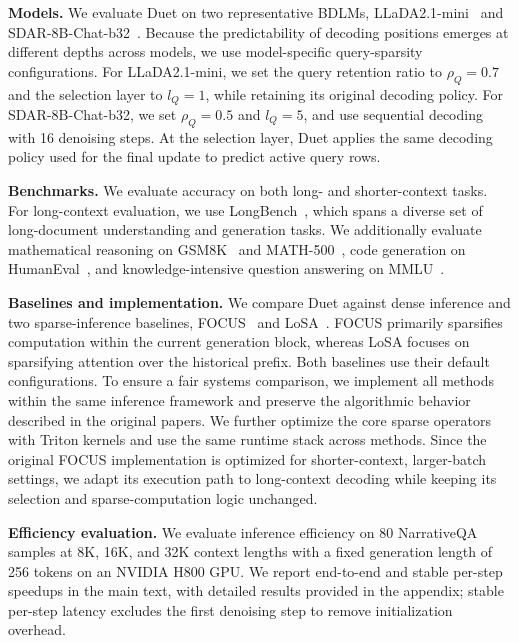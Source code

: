 \textbf{Models.} We evaluate Duet on two representative BDLMs, LLaDA2.1-mini~\citep{bie2026llada21speedingtextdiffusion} and SDAR-8B-Chat-b32~\citep{cheng2025sdar}. Because the predictability of decoding positions emerges at different depths across models, we use model-specific query-sparsity configurations. For LLaDA2.1-mini, we set the query retention ratio to $\rho_Q=0.7$ and the selection layer to $l_Q=1$, while retaining its original decoding policy. For SDAR-8B-Chat-b32, we set $\rho_Q=0.5$ and $l_Q=5$, and use sequential decoding with 16 denoising steps. At the selection layer, Duet applies the same decoding policy used for the final update to predict active query rows.

\textbf{Benchmarks.} We evaluate accuracy on both long- and shorter-context tasks. For long-context evaluation, we use LongBench~\citep{bai2024longbench}, which spans a diverse set of long-document understanding and generation tasks. We additionally evaluate mathematical reasoning on GSM8K~\citep{cobbe2021gsm8k} and MATH-500~\citep{hendrycksmath2021}, code generation on HumanEval~\citep{chen2021evaluating}, and knowledge-intensive question answering on MMLU~\citep{hendryckstest2021}.

\textbf{Baselines and implementation.} We compare Duet against dense inference and two sparse-inference baselines, FOCUS~\citep{liang2026focus} and LoSA~\citep{xi2026losa}. FOCUS primarily sparsifies computation within the current generation block, whereas LoSA focuses on sparsifying attention over the historical prefix. Both baselines use their default configurations. To ensure a fair systems comparison, we implement all methods within the same inference framework and preserve the algorithmic behavior described in the original papers. We further optimize the core sparse operators with Triton kernels and use the same runtime stack across methods. Since the original FOCUS implementation is optimized for shorter-context, larger-batch settings, we adapt its execution path to long-context decoding while keeping its selection and sparse-computation logic unchanged.

\textbf{Efficiency evaluation.} We evaluate inference efficiency on 80 NarrativeQA samples at 8K, 16K, and 32K context lengths with a fixed generation length of 256 tokens on an NVIDIA H800 GPU. We report end-to-end and stable per-step speedups in the main text, with detailed results provided in the appendix; stable per-step latency excludes the first denoising step to remove initialization overhead.


